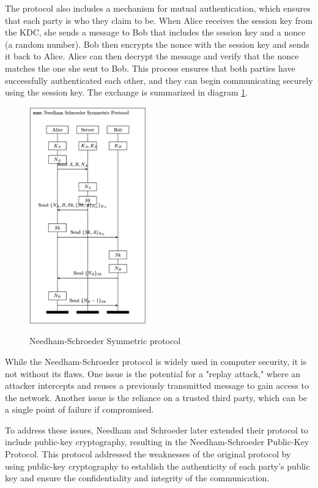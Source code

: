 \documentclass[fleqn,10pt]{SelfArx} %
\begin{document}
The protocol also includes a mechanism for mutual authentication, which ensures that each party is who they claim to be. When Alice receives the session key from the KDC, she sends a message to Bob that includes the session key and a nonce (a random number). Bob then encrypts the nonce with the session key and sends it back to Alice. Alice can then decrypt the message and verify that the nonce matches the one she sent to Bob. This process ensures that both parties have successfully authenticated each other, and they can begin communicating securely using the session key. The exchange is summarized in diagram \ref{fig:NS}.

\begin{figure}[h]
    \centering
    \captionsetup{justification=centering, margin=1cm}
    \includegraphics[width=0.45\textwidth]{Figures/NS.png}
    \label{fig:NS}
    \caption{Needham-Schroeder Symmetric protocol}
\end{figure}
%

While the Needham-Schroeder protocol is widely used in computer security, it is not without its flaws. One issue is the potential for a "replay attack," where an attacker intercepts and reuses a previously transmitted message to gain access to the network. Another issue is the reliance on a trusted third party, which can be a single point of failure if compromised.

To address these issues, Needham and Schroeder later extended their protocol to include public-key cryptography, resulting in the Needham-Schroeder Public-Key Protocol. This protocol addressed the weaknesses of the original protocol by using public-key cryptography to establish the authenticity of each party's public key and ensure the confidentiality and integrity of the communication.
\end{document}
